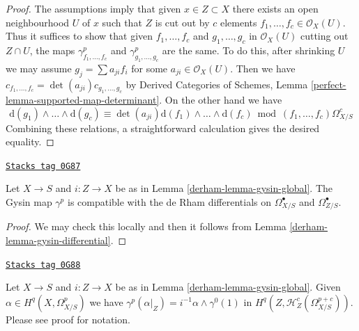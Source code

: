 \begin{proof}
The assumptions imply that given $x \in Z \subset X$ there exists an
open neighbourhood $U$ of $x$ such that $Z$ is cut out by $c$
elements $f_1, \ldots, f_c \in \mathcal{O}_X(U)$. Thus
it suffices to show that given $f_1, \ldots, f_c$ and
$g_1, \ldots, g_c$ in $\mathcal{O}_X(U)$ cutting out $Z \cap U$,
the maps $\gamma^p_{f_1, \ldots, f_c}$
and $\gamma^p_{g_1, \ldots, g_c}$ are the same. To do this, after shrinking
$U$ we may assume $g_j = \sum a_{ji} f_i$ for some
$a_{ji} \in \mathcal{O}_X(U)$. Then we have
$c_{f_1, \ldots, f_c} = \det(a_{ji}) c_{g_1, \ldots, g_c}$ by
Derived Categories of Schemes, Lemma
\ref{perfect-lemma-supported-map-determinant}.
On the other hand we have
$$
\text{d}(g_1) \wedge \ldots \wedge \text{d}(g_c) \equiv
\det(a_{ji}) \text{d}(f_1) \wedge \ldots \wedge \text{d}(f_c)
\bmod (f_1, \ldots, f_c)\Omega^c_{X/S}
$$
Combining these relations, a straightforward calculation gives the
desired equality.
\end{proof}

\begin{lemma}
\label{derham-lemma-gysin-differential-global}
\href{https://stacks.math.columbia.edu/tag/0G87}{\texttt{Stacks tag 0G87}}

Let $X \to S$ and $i : Z \to X$ be as in Lemma \ref{derham-lemma-gysin-global}.
The Gysin map $\gamma^p$ is compatible with the de Rham
differentials on $\Omega^\bullet_{X/S}$ and $\Omega^\bullet_{Z/S}$.
\end{lemma}

\begin{proof}

We may check this locally and then it follows from
Lemma \ref{derham-lemma-gysin-differential}.
\end{proof}

\begin{lemma}
\label{derham-lemma-gysin-projection}
\href{https://stacks.math.columbia.edu/tag/0G88}{\texttt{Stacks tag 0G88}}

Let $X \to S$ and $i : Z \to X$ be as in Lemma \ref{derham-lemma-gysin-global}.
Given $\alpha \in H^q(X, \Omega^p_{X/S})$ we have
$\gamma^p(\alpha|_Z) = i^{-1}\alpha \wedge \gamma^0(1)$ in
$H^q(Z, \mathcal{H}^c_Z(\Omega^{p + c}_{X/S}))$.
Please see proof for notation.
\end{lemma}

